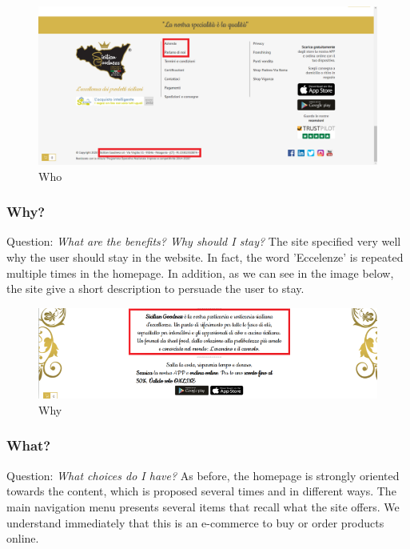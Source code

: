 \begin{figure}[H]
	\centering\includegraphics[width=12cm]{Img/who.png}
	\caption{Who}
\end{figure}

\subsubsection{Why?}

Question: \textit{What are the benefits? Why should I stay?}
\newline
The site specified very well why the user should stay in the website. In fact, the word 'Eccelenze' is repeated multiple times in the homepage.
In addition, as we can see in the image below, the site give a short description to persuade the user to stay.
\begin{figure}[H]
	\centering\includegraphics[width=12cm]{Img/why.png}
	\caption{Why}
\end{figure}

\pagebreak

\subsubsection{What?}

Question: \textit{What choices do I have?}
\newline
As before, the homepage is strongly oriented towards the content, which is proposed several times and in different ways. The main navigation menu presents several items that recall what the site offers. We understand immediately that this is an e-commerce to buy or order products online.

